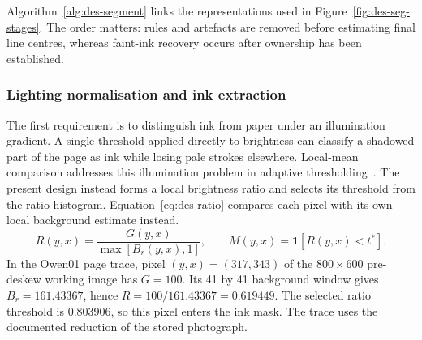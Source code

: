 Algorithm~\ref{alg:des-segment} links the representations used in Figure~\ref{fig:des-seg-stages}. The order matters: rules and artefacts are removed before estimating final line centres, whereas faint-ink recovery occurs after ownership has been established.


\begin{designalgorithm}
\caption{Photographed page to ordered line crops}
\label{alg:des-segment}
\begin{designpseudo}
\end{designpseudo}
\end{designalgorithm}

\subsubsection{Lighting normalisation and ink extraction}
The first requirement is to distinguish ink from paper under an illumination gradient. A single threshold applied directly to brightness can classify a shadowed part of the page as ink while losing pale strokes elsewhere. Local-mean comparison addresses this illumination problem in adaptive thresholding~\cite[PDF pp.~2--3, Secs.~2.2--3]{bradley2007}. The present design instead forms a local brightness ratio and selects its threshold from the ratio histogram. Equation~\ref{eq:des-ratio} compares each pixel with its own local background estimate instead.
\begin{equation}
R(y,x)=\frac{G(y,x)}{\max[B_r(y,x),1]},\qquad
M(y,x)=\mathbf{1}[R(y,x)<t^*].
\label{eq:des-ratio}
\end{equation}
In the Owen01 page trace, pixel $(y,x)=(317,343)$ of the $800\times600$ pre-deskew working image has $G=100$. Its 41 by 41 background window gives $B_r=161.43367$, hence $R=100/161.43367=0.619449$. The selected ratio threshold is $0.803906$, so this pixel enters the ink mask. The trace uses the documented reduction of the stored photograph.

